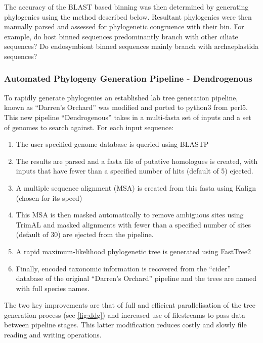 The accuracy of the BLAST based binning was then determined by generating phylogenies
using the method described below. Resultant phylogenies were then manually
parsed and assessed for phylogenetic congruence with their bin.
For example, do host binned sequences predominantly branch with other ciliate sequences?
Do endosymbiont binned sequences mainly branch with archaeplastida sequences?

\subsubsection{Automated Phylogeny Generation Pipeline - Dendrogenous}

To rapidly generate phylogenies an established lab tree generation pipeline, known as ``Darren's Orchard'' 
\citep{Richards2009g} was modified and ported to python3 from perl5.  This new pipeline ``Dendrogenous'' 
takes in a multi-fasta set of inputs and a set of genomes to search against.
For each input sequence:
\begin{enumerate} 
    \item The user specified genome database is queried using BLASTP
    \item The results are parsed and a fasta file of putative homologues is created, with inputs that have fewer than a specified 
        number of hits (default of 5) ejected.
    \item A multiple sequence alignment (MSA) is created from this fasta using Kalign (chosen for its speed) \citep{Lassmann2009}
    \item This MSA is then masked automatically to remove ambiguous sites using TrimAL \citep{Capella-Gutierrez2009} and masked alignments
        with fewer than a specified number of sites (default of 30) are ejected from the pipeline.
    \item A rapid maximum-likelihood phylogenetic tree is generated using FastTree2 \citep{Price2010}
    \item Finally, encoded taxonomic information is recovered from the ``cider'' database of the original ``Darren's Orchard'' pipeline 
        and the trees are named with full species names.
\end{enumerate}
The two key improvements are that of full and efficient parallelisation of the tree generation process (see \cref{fig:ddg})
and increased use of filestreams to pass data between pipeline stages.  This latter modification reduces costly and slowly
file reading and writing operations.


